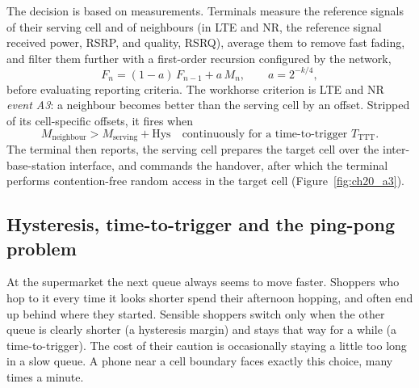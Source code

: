 The decision is based on measurements. Terminals measure the reference signals of their serving cell and of
neighbours (in LTE and NR, the reference signal received power, RSRP, and quality, RSRQ), average them to remove
fast fading, and filter them further with a first-order recursion configured by the network,
\begin{equation}
F_n=(1-a)\,F_{n-1}+a\,M_n,\qquad a=2^{-k/4},
\end{equation}
before evaluating reporting criteria. The workhorse criterion is LTE and NR \emph{event A3}: a neighbour becomes
better than the serving cell by an offset. Stripped of its cell-specific offsets, it fires when
\begin{equation}
M_{\text{neighbour}}>M_{\text{serving}}+\mathrm{Hys}\quad\text{continuously for a time-to-trigger } T_{\text{TTT}}.
\end{equation}
The terminal then reports, the serving cell prepares the target cell over the inter-base-station interface, and
commands the handover, after which the terminal performs contention-free random access in the target cell
(Figure~\ref{fig:ch20_a3}).

\subsection{Hysteresis, time-to-trigger and the ping-pong problem}


\begin{analogy}
At the supermarket the next queue always seems to move faster. Shoppers who hop to it every time it looks
shorter spend their afternoon hopping, and often end up behind where they started. Sensible shoppers switch only
when the other queue is clearly shorter (a hysteresis margin) and stays that way for a while (a time-to-trigger).
The cost of their caution is occasionally staying a little too long in a slow queue. A phone near a cell boundary
faces exactly this choice, many times a minute.
\end{analogy}

